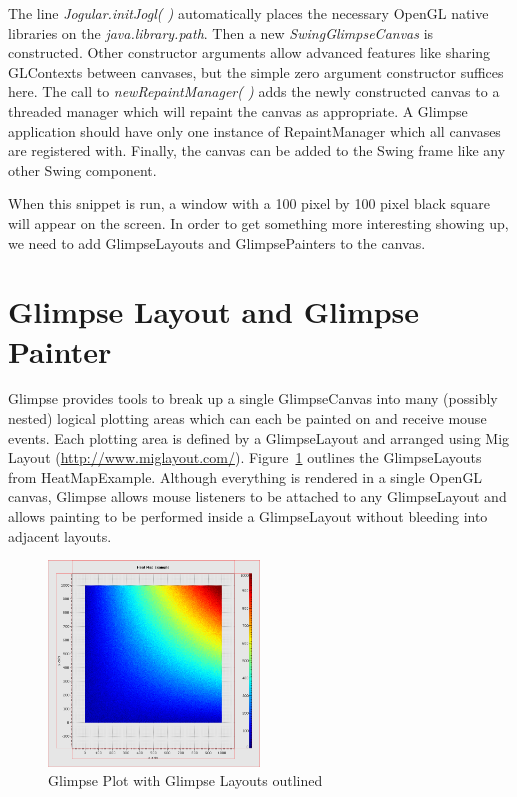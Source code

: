 \documentclass[12pt]{article}
\begin{document}
The line \emph{Jogular.initJogl( )} automatically places the necessary OpenGL native libraries on the \emph{java.library.path}. Then a new \emph{SwingGlimpseCanvas} is constructed. Other constructor arguments allow advanced features like sharing GLContexts between canvases, but the simple zero argument constructor suffices here. The call to \emph{newRepaintManager( )} adds the newly constructed canvas to a threaded manager which will repaint the canvas as appropriate. A Glimpse application should have only one instance of RepaintManager which all canvases are registered with. Finally, the canvas can be added to the Swing frame like any other Swing component.

When this snippet is run, a window with a 100 pixel by 100 pixel black square will appear on the screen. In order to get something more interesting showing up, we need to add GlimpseLayouts and GlimpsePainters to the canvas.

\section{Glimpse Layout and Glimpse Painter}

Glimpse provides tools to break up a single GlimpseCanvas into many (possibly nested) logical plotting areas which can each be painted on and receive mouse events. Each plotting area is defined by a GlimpseLayout and arranged using Mig Layout (\url{http://www.miglayout.com/}). Figure~\ref{simpleplotoutlines} outlines the GlimpseLayouts from HeatMapExample. Although everything is rendered in a single OpenGL canvas, Glimpse allows mouse listeners to be attached to any GlimpseLayout and allows painting to be performed inside a GlimpseLayout without bleeding into adjacent layouts.

\begin{figure}
  \centering
    \includegraphics[width=0.5\textwidth]{images/Heatmap_red_layout_bounds.png}
  \caption{Glimpse Plot with Glimpse Layouts outlined}
\label{simpleplotoutlines}
\end{figure}
\end{document}
